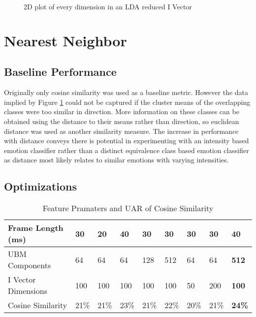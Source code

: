 		\begin{figure}[!htb]
		\caption{\label{fig:5graphLDA} 2D plot of every dimension in an LDA reduced I Vector}
	\end{figure}

	\section{Nearest Neighbor}
	\subsection{Baseline Performance}
	Originally only cosine similarity was used as a baseline metric. However the data implied by Figure \ref{fig:5graphLDA} could not be captured if the cluster means of the overlapping classes were too similar in direction. More information on these classes can be obtained using the distance to their means rather than direction, so euclidean distance was used as another similarity measure. The increase in performance with distance conveys there is potential in experimenting with an intensity based emotion classifier rather than a distinct equivalence class based emotion classifier as distance most likely relates to similar emotions with varying intensities.
	
	\subsection{Optimizations}
	 	 \begin{table}[!hbt]
	 	\caption{Feature Pramaters and UAR of Cosine Similarity}
	 	\centering
	 	\begin{tabular}{|l|l|l|l|l|l|l|l|l|}
	 		\hline
	 		Frame Length (ms)   & 30   & 20   & 40   & 30   & 30   & 30   & 30   & \textbf{40}   \\ \hline
	 		UBM Components      & 64   & 64   & 64   & 128  & 512  & 64   & 64   & \textbf{512}  \\ \hline
	 		I Vector Dimensions & 100  & 100  & 100  & 100  & 100  & 50   & 200  & \textbf{100}  \\ \hline
	 		Cosine Similarity   & 21\% & 21\% & 23\% & 21\% & 22\% & 20\% & 21\% & \textbf{24\%} \\ \hline
	 	\end{tabular}
	 	\label{featureparams}
	 \end{table}
 
